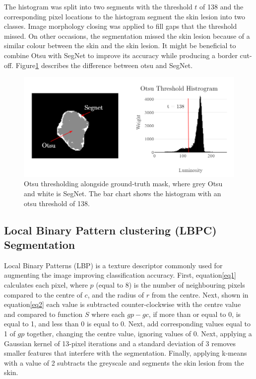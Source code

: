 The histogram was split into two segments with the threshold $t$ of 138 and the corresponding pixel locations to the histogram segment the skin lesion into two classes. Image morphology closing was applied to fill gaps that the threshold missed. On other occasions, the segmentation missed the skin lesion because of a similar colour between the skin and the skin lesion. It might be beneficial to combine Otsu with SegNet to improve its accuracy while producing a border cut-off. Figure\ref{otsu2} describes the difference between otsu and SegNet.

\begin{figure}
\centering
\includegraphics[scale=0.7]{images/otsu3.png}
\caption{Otsu thresholding alongside ground-truth mask, where grey Otsu and white is SegNet. The bar chart shows the histogram with an otsu threshold of 138.}\label{otsu2}
\end{figure}

\subsection{Local Binary Pattern clustering (LBPC) Segmentation}
Local Binary Patterns (LBP) is a texture descriptor commonly used for augmenting the image improving classification accuracy\cite{Pereira2020, Kaya2016}. First, equation\ref{eq1} calculates each pixel, where $p$ (equal to 8) is the number of neighbouring pixels compared to the centre of $c$, and the radius of $r$ from the centre. Next, shown in equation\ref{eq2} each value is subtracted counter-clockwise with the centre value and compared to function $S$ where each $gp - gc$, if more than or equal to 0, is equal to 1, and less than 0 is equal to 0. Next, add corresponding values equal to 1 of $gp$ together, changing the centre value, ignoring values of 0. Next, applying a Gaussian kernel of 13-pixel iterations and a standard deviation of 3 removes smaller features that interfere with the segmentation. Finally, applying k-means with a value of 2 subtracts the greyscale and segments the skin lesion from the skin.

